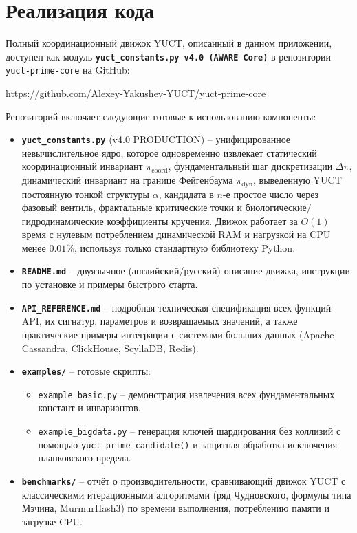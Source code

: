 \documentclass[12pt,a4paper]{article}
\begin{document}
	\section{Реализация кода}
	\label{sec:code}
	
	Полный координационный движок \textsc{YUCT}, описанный в данном приложении, доступен как модуль
	\textbf{\texttt{yuct\_constants.py v4.0 (AWARE Core)}} в репозитории
	\texttt{yuct-prime-core} на GitHub:
	\begin{center}
		\url{https://github.com/Alexey-Yakushev-YUCT/yuct-prime-core}
	\end{center}
	
	\noindent Репозиторий включает следующие готовые к использованию компоненты:
	
	\begin{itemize}
		\item \textbf{\texttt{yuct\_constants.py}} (v4.0 PRODUCTION) – унифицированное невычислительное ядро, которое одновременно извлекает статический координационный инвариант $\pi_{\mathrm{coord}}$, фундаментальный шаг дискретизации $\Delta\pi$, динамический инвариант на границе Фейгенбаума $\pi_{\mathrm{dyn}}$, выведенную YUCT постоянную тонкой структуры $\alpha$, кандидата в $n$-е простое число через фазовый вентиль, фрактальные критические точки и биологические/гидродинамические коэффициенты кручения. Движок работает за $O(1)$ время с нулевым потреблением динамической RAM и нагрузкой на CPU менее $0.01\%$, используя только стандартную библиотеку Python.
		
		\item \textbf{\texttt{README.md}} – двуязычное (английский/русский) описание движка, инструкции по установке и примеры быстрого старта.
		
		\item \textbf{\texttt{API\_REFERENCE.md}} – подробная техническая спецификация всех функций API, их сигнатур, параметров и возвращаемых значений, а также практические примеры интеграции с системами больших данных (Apache Cassandra, ClickHouse, ScyllaDB, Redis).
		
		\item \textbf{\texttt{examples/}} – готовые скрипты:
		\begin{itemize}
			\item \texttt{example\_basic.py} – демонстрация извлечения всех фундаментальных констант и инвариантов.
			\item \texttt{example\_bigdata.py} – генерация ключей шардирования без коллизий с помощью \texttt{yuct\_prime\_candidate()} и защитная обработка исключения планковского предела.
		\end{itemize}
		
		\item \textbf{\texttt{benchmarks/}} – отчёт о производительности, сравнивающий движок YUCT с классическими итерационными алгоритмами (ряд Чудновского, формулы типа Мэчина, MurmurHash3) по времени выполнения, потреблению памяти и загрузке CPU.
	\end{itemize}
	
\end{document}
